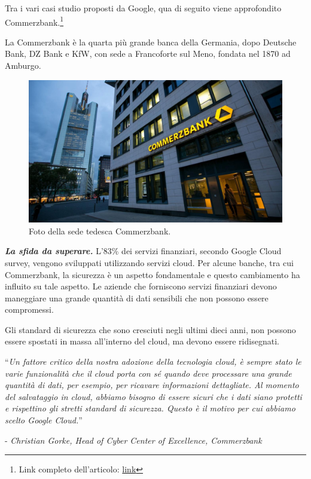 \documentclass[a4paper]{article}
\newcommand{\dquotes}[1]{``#1''}
\begin{document}
	Tra i vari casi studio proposti da Google, qua di seguito viene approfondito Commerzbank.\footnote{Link completo dell'articolo: \href{https://cloud.google.com/customers/commerzbankag}{link}}\newline
	
	\noindent
	La Commerzbank è la quarta più grande banca della Germania, dopo Deutsche Bank, DZ Bank e KfW, con sede a Francoforte sul Meno, fondata nel 1870 ad Amburgo.
	\begin{figure}[!htp]
		\centering
		\includegraphics[width=\textwidth]{img/Googe-2.jpg}
		\caption{Foto della sede tedesca Commerzbank.}
	\end{figure}\newpage
	
	\noindent
	\textbf{\emph{La sfida da superare.}} L'83\% dei servizi finanziari, secondo Google Cloud survey, vengono sviluppati utilizzando servizi cloud. Per alcune banche, tra cui Commerzbank, la sicurezza è un aspetto fondamentale e questo cambiamento ha influito su tale aspetto. Le aziende che forniscono servizi finanziari devono maneggiare una grande quantità di dati sensibili che non possono essere compromessi.
	
	Gli standard di sicurezza che sono cresciuti negli ultimi dieci anni, non possono essere spostati in massa all'interno del cloud, ma devono essere ridisegnati.
	\begin{center}
		\dquotes{\emph{Un fattore critico della nostra adozione della tecnologia cloud, è sempre stato le varie funzionalità che il cloud porta con sé quando deve processare una grande quantità di dati, per esempio, per ricavare informazioni dettagliate. Al momento del salvataggio in cloud, abbiamo bisogno di essere sicuri che i dati siano protetti e rispettino gli stretti standard di sicurezza. Questo è il motivo per cui abbiamo scelto Google Cloud.}}\newline
		
		\noindent
		- \emph{Christian Gorke, Head of Cyber Center of Excellence, Commerzbank}
	\end{center}\:\newline
	
\end{document}
